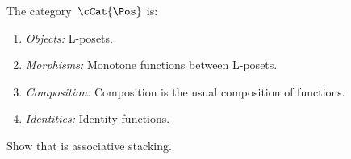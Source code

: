 \begin{definition}
    \label{def:PosL}
    The category~$\cCat{\Pos}$ is:
    \begin{enumerate}
        \item \emph{Objects:} L-posets.
        \item \emph{Morphisms:}
              Monotone functions between L-posets.
        \item \emph{Composition:}
              Composition is the usual composition of functions.
        \item \emph{Identities:}
              Identity functions.
    \end{enumerate}
\end{definition}

\begin{lemma}
    Show that \cCat{\Pos} is associative stacking.
\end{lemma}

